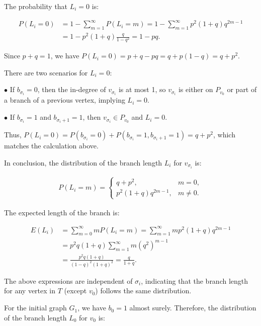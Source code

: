 \documentclass[10pt,twoside]{article}
\begin{document}
The probability that $L_i = 0$ is:
 

$$
\begin{aligned}
P(L_i = 0) &= 1 - \sum_{m=1}^{\infty} P(L_i = m) = 1 - \sum_{m=1}^{\infty} p^2 (1 + q) q^{2m-1} \\
&= 1 - p^2 (1 + q) \frac{q}{1 - q^2} = 1 - pq.
\end{aligned}
$$

 
Since $p + q = 1$, we have $P(L_i = 0) = p + q - pq = q + p(1 - q) = q + p^2$.

There are two scenarios for $L_i = 0$:

$\bullet$ If $b_{\sigma_i} = 0$, then the in-degree of $v_{\sigma_i}$ is at most 1, so $v_{\sigma_i}$ is either on $P_{v_0}$ or part of a branch of a previous vertex, implying $L_i = 0$.

$\bullet$ If $b_{\sigma_i} = 1$ and $b_{\sigma_i+1} = 1$, then $v_{\sigma_i} \in P_{v_0}$ and $L_i = 0$.

Thus, $P(L_i = 0) = P(b_{\sigma_i} = 0) + P(b_{\sigma_i} = 1, b_{\sigma_i+1} = 1) = q + p^2$, which matches the calculation above.

In conclusion, the distribution of the branch length $L_i$ for $v_{\sigma_i}$ is:
 
\begin{eqnarray}
P(L_i = m) =
\begin{cases}
q + p^2, & m = 0, \\
p^2 (1 + q) q^{2m-1}, & m \neq 0.
\end{cases}\label{001}
\end{eqnarray}


The expected length of the branch is:
 

$$
\begin{aligned}
E(L_i) &= \sum_{m=0}^{\infty} m P(L_i = m) = \sum_{m=1}^{\infty} m p^2 (1 + q) q^{2m-1}\\
&= p^2 q (1 + q) \sum_{m=1}^{\infty} m (q^2)^{m-1}\\
&= \frac{p^2 q (1 + q)}{(1 - q)^2 (1 + q)^2}= \frac{q}{1 + q}.
\end{aligned}
$$

 

The above expressions are independent of $\sigma_i$, indicating that the branch length for any vertex in $T$ (except $v_0$) follows the same distribution. 

For the initial graph $G_1$, we have $b_0 = 1$ almost surely. Therefore, the distribution of the branch length $L_0$ for $v_0$ is:
 
\end{document}
